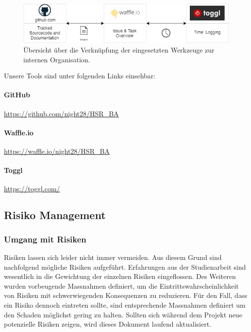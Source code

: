 \begin{figure}[H]
	\centering
	\includegraphics[width=13cm]{img/EingesetzteToolsZurOrganisation.png}
	\caption{Übersicht über die Verknüpfung der eingesetzten Werkzeuge zur internen Organisation.}
	\label{fig:Interne Organisationsstruktur}
\end{figure} 

Unsere Tools sind unter folgenden Links einsehbar:
\paragraph{GitHub} \href{https://github.com/night28/HSR\_BA}{https://github.com/night28/HSR\_BA} 

\paragraph{Waffle.io} \href{https://waffle.io/night28/HSR\_BA}{https://waffle.io/night28/HSR\_BA}

\paragraph{Toggl} \href{https://toggl.com/}{https://toggl.com/}
 
\subsection{Risiko Management}

\subsubsection{Umgang mit Risiken}
Risiken lassen sich leider nicht immer vermeiden. Aus diesem Grund sind nachfolgend mögliche Risiken aufgeführt. Erfahrungen aus der Studienarbeit sind wesentlich in die Gewichtung der einzelnen Risiken eingeflossen. Des Weiteren wurden vorbeugende Massnahmen definiert, um die Eintrittswahrscheinlichkeit von Risiken mit schwerwiegenden Konsequenzen zu reduzieren. Für den Fall, dass ein Risiko dennoch eintreten sollte, sind entsprechende Massnahmen definiert um den Schaden möglichst gering zu halten.
Sollten sich während dem Projekt neue potenzielle Risiken zeigen, wird dieses Dokument laufend aktualisiert.

